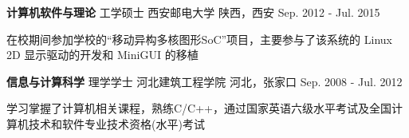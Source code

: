 
\begin{cventries}
  \cventry
    {\textbf{计算机软件与理论} \hspace{0.2cm} 工学硕士} %
    {西安邮电大学} %
    {陕西，西安} %
    {Sep. 2012 - Jul. 2015} %
    {
      \begin{cvitems} %
         \item {在校期间参加学校的“移动异构多核图形SoC”项目，主要参与了该系统的 Linux 2D 显示驱动的开发和 MiniGUI 的移植}
      \end{cvitems}
    }

  \cventry
    {\textbf{信息与计算科学} \hspace{0.2cm} 理学学士} %
    {河北建筑工程学院} %
    {河北，张家口} %
    {Sep. 2008 - Jul. 2012} %
    {
      \begin{cvitems} %
      \item {学习掌握了计算机相关课程，熟练C/C++，通过国家英语六级水平考试及全国计算机技术和软件专业技术资格(水平)考试}
      \end{cvitems}
    }
\end{cventries}
